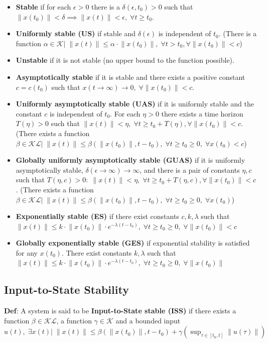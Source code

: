 \begin{itemize}
    \item \textbf{Stable} if for each $\epsilon >0$ there is a $\delta(\epsilon,t_0)>0$ such that $\lVert x(t_0) \rVert < \delta \implies \lVert x(t) \rVert < \epsilon , \; \forall t \ge t_0$.
    \item \textbf{Uniformly stable (US)} if stable and $\delta(\epsilon)$ is independent of $t_0$. (There is a function $\alpha \in \mathcal{K} | \; \lVert x(t) \rVert \le \alpha \cdot \lVert x(t_0) \rVert, \; \forall t > t_0, \forall \lVert x(t_0) \rVert < c$)
    \item \textbf{Unstable} if it is not stable (no upper bound to the function possible).
    \item \textbf{Asymptotically stable} if it is stable and there exists a positive constant $c = c(t_0)$ such that $x(t\to \infty) \to 0, \; \forall \lVert x(t_0) \rVert < c$.
    \item \textbf{Uniformly asymptotically stable (UAS)} if it is uniformly stable and the constant $c$ is independent of $t_0$. For each $\eta >0$ there exists a time horizon $T(\eta) > 0$ such that $\lVert x(t) \rVert < \eta, \; \forall t \ge t_0 + T(\eta), \forall \lVert x(t_0) \rVert < c$. (There exists a function $\beta \in \mathcal{KL} | \; \lVert x(t) \rVert \le \beta(\lVert x(t_0) \rVert, t-t_0), \; \forall t \ge t_0 \ge 0, \; \forall x(t_0) < c$)
    \item \textbf{Globally uniformly asymptotically stable (GUAS)} if it is uniformly asymptotically stable, $\delta(\epsilon \to \infty)\to \infty$, and there is a pair of constants $\eta,c$ such that $T(\eta,c)>0: \; \lVert x(t) \rVert < \eta, \; \forall t \ge t_0 + T(\eta,c), \forall \lVert x(t_0) \rVert < c$. (There exists a function $\beta \in \mathcal{KL} | \; \lVert x(t) \rVert \le \beta(\lVert x(t_0) \rVert, t-t_0), \; \forall t \ge t_0 \ge 0, \; \forall x(t_0)$)
    \item \textbf{Exponentially stable (ES)} if there exist constants $c,k,\lambda$ such that $\lVert x(t) \rVert \le k \cdot \lVert x(t_0) \rVert \cdot e^{-\lambda(t-t_0)}, \; \forall t\ge t_0 \ge 0, \; \forall \lVert x(t_0) \rVert < c$
    \item \textbf{Globally exponentially stable (GES)} if exponential stability is satisfied for any $x(t_0)$. There exist constants $k,\lambda$ such that $\lVert x(t) \rVert \le k \cdot \lVert x(t_0) \rVert \cdot e^{-\lambda(t-t_0)}, \; \forall t\ge t_0 \ge 0, \; \forall \lVert x(t_0) \rVert$
\end{itemize}
\subsection{Input-to-State Stability}
\textbf{Def}: A system is said to be \textbf{Input-to-State stable (ISS)} if there exists a function $\beta \in \mathcal{KL}$, a function $\gamma \in \mathcal{K}$ and a bounded input $u(t), \; \exists x(t) | \; \lVert x(t) \rVert \le \beta(\lVert x(t_0) \rVert, t-t_0) + \gamma(\sup_{\tau \in [t_0,t]} \lVert u(\tau) \rVert)$
